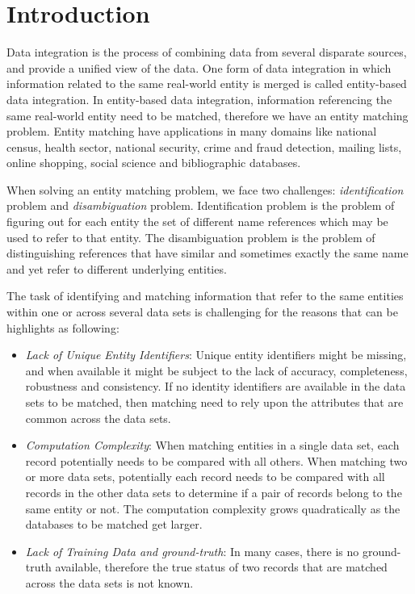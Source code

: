 \chapter{Introduction}

Data integration is the process of combining data from several disparate sources, and provide a unified view of the data. One form of data integration in which information related to the same real-world entity is merged is called entity-based data integration. In entity-based data integration, information referencing the same real-world entity need to be matched, therefore we have an entity matching problem. Entity matching have applications in many domains like national census, health sector, national security, crime and fraud detection, mailing lists, online shopping, social science and bibliographic databases\cite{Chri12}.

When solving an entity matching problem, we face two challenges: \textit{identification} problem and \textit{disambiguation} problem. Identification problem is the problem of figuring out for each entity the set of different name references which may be used to refer to that entity\cite{BhGe07}. The disambiguation problem is the problem of distinguishing references that have similar and sometimes exactly the same name and yet refer to different underlying entities\cite{BhGe07}.

The task of identifying and matching information that refer to the same entities within one or across several data sets is challenging for the reasons that can be highlights as following\cite{Chri12}:
\begin{itemize}

\item \textit{Lack of Unique Entity Identifiers}: Unique entity identifiers might be missing, and when available it might be subject to the lack of accuracy, completeness, robustness and consistency. If no identity identifiers are available in the data sets to be matched, then matching need to rely upon the attributes that are common across the data sets.

\item \textit{Computation Complexity}: When matching entities in a single data set, each record potentially needs to be compared with all others. When matching two or more data sets, potentially each record needs to be compared with all records in the other data sets to determine if a pair of records belong to the same entity or not. The computation complexity grows quadratically as the databases to be matched get larger.

\item \textit{Lack of Training Data and ground-truth}: In many cases, there is no ground-truth available, therefore the true status of two records that are matched across the data sets is not known. 
\end{itemize} 

